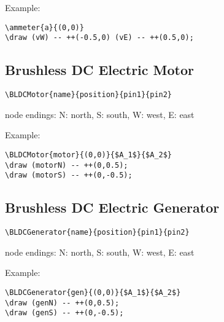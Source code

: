 \documentclass[parskip=full]{scrartcl}
\begin{document}
Example:\\
\begin{minipage}{0.8\textwidth}
\begin{verbatim}
\ammeter{a}{(0,0)}
\draw (vW) -- ++(-0.5,0) (vE) -- ++(0.5,0);
\end{verbatim}
\end{minipage}
\begin{minipage}{0.19\textwidth}
\end{minipage}

\subsection{Brushless DC Electric Motor}

\begin{verbatim}
\BLDCMotor{name}{position}{pin1}{pin2}
\end{verbatim}
node endings: N: north, S: south, W: west, E: east

Example:\\
\begin{minipage}{0.8\textwidth}
\begin{verbatim}
\BLDCMotor{motor}{(0,0)}{$A_1$}{$A_2$}
\draw (motorN) -- ++(0,0.5);
\draw (motorS) -- ++(0,-0.5);
\end{verbatim}
\end{minipage}
\begin{minipage}{0.19\textwidth}
\end{minipage}

\subsection{Brushless DC Electric Generator}

\begin{verbatim}
\BLDCGenerator{name}{position}{pin1}{pin2}
\end{verbatim}
node endings: N: north, S: south, W: west, E: east

Example:\\
\begin{minipage}{0.8\textwidth}
\begin{verbatim}
\BLDCGenerator{gen}{(0,0)}{$A_1$}{$A_2$}
\draw (genN) -- ++(0,0.5);
\draw (genS) -- ++(0,-0.5);
\end{verbatim}
\end{minipage}
\begin{minipage}{0.19\textwidth}
\end{minipage}
\end{document}
